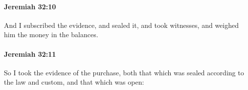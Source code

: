 		\paragraph{Jeremiah 32:10} %
			\label{JEREMIAH-32-10}

			And I subscribed the evidence, and sealed it, and took witnesses, and weighed him the money in the balances.


		\paragraph{Jeremiah 32:11} %
			\label{JEREMIAH-32-11}

			So I took the evidence of the purchase, both that which was sealed according to the law and custom, and that which was open:


